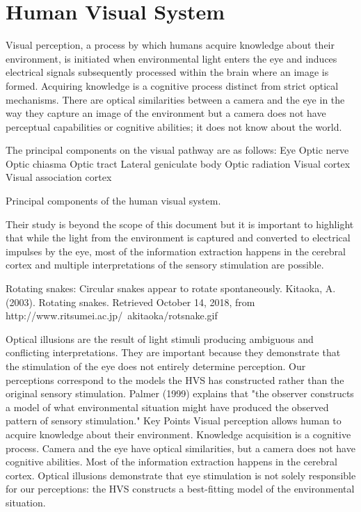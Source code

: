 \section{Human Visual System}%
\label{sec:human-visual-system}

Visual perception, a process by which humans acquire knowledge about their environment, is initiated when environmental light enters the eye and induces electrical signals subsequently processed within the brain where an image is formed. Acquiring knowledge is a cognitive process distinct from strict optical mechanisms. There are optical similarities between a camera and the eye in the way they capture an image of the environment but a camera does not have perceptual capabilities or cognitive abilities; it does not know about the world.

The principal components on the visual pathway are as follows:
Eye
Optic nerve
Optic chiasma
Optic tract
Lateral geniculate body
Optic radiation
Visual cortex
Visual association cortex

Principal components of the human visual system.

Their study is beyond the scope of this document but it is important to highlight that while the light from the environment is captured and converted to electrical impulses by the eye, most of the information extraction happens in the cerebral cortex and multiple interpretations of the sensory stimulation are possible.

Rotating snakes: Circular snakes appear to rotate spontaneously.
Kitaoka, A. (2003). Rotating snakes. Retrieved October 14, 2018, from http://www.ritsumei.ac.jp/~akitaoka/rotsnake.gif

Optical illusions are the result of light stimuli producing ambiguous and conflicting interpretations. They are important because they demonstrate that the stimulation of the eye does not entirely determine perception. Our perceptions correspond to the models the HVS has constructed rather than the original sensory stimulation. Palmer (1999) explains that "the observer constructs a model of what environmental situation might have produced the observed pattern of sensory stimulation."
Key Points
Visual perception allows human to acquire knowledge about their environment.
Knowledge acquisition is a cognitive process.
Camera and the eye have optical similarities, but a camera does not have cognitive abilities.
Most of the information extraction happens in the cerebral cortex.
Optical illusions demonstrate that eye stimulation is not solely responsible for our perceptions: the HVS constructs a best-fitting model of the environmental situation.

